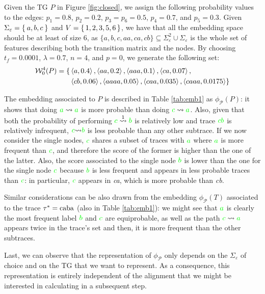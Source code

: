 \begin{example}\label{ex:withpaths}
Given the TG $P$ in Figure \ref{fig:closed}, we assign the following probability values to the edges: $p_1=0.8$, $p_2=0.2$, $p_3=p_6=0.5$, $p_4=0.7$, and $p_5=0.3$. Given $\Sigma_\varepsilon=\Set{a,b,c}$ and $V=\set{1,2,3,5,6}$, we have that all the embedding space should be at least of size $6$, as $\{a,b,c,aa,ca,cb\}\subseteq \Sigma_\varepsilon^2\cup\Sigma_\varepsilon$ is the whole set of features describing both the transition matrix and the nodes. By choosing $t_f=0.0001$, $\lambda=0.7$, $n=4$, and $p=0$, we generate the following set:
$$\begin{aligned}
\mathcal{W}_0^4(P)=\{&\braket{a,0.4},\braket{aa,0.2},\braket{aaa,0.1},\braket{ca,0.07},\\
&\braket{cb,0.06},\braket{aaaa,0.05},\braket{caa,0.035},\braket{caaa,0.0175}\}\\
\end{aligned}$$


The embedding associated to $P$ is described in Table \ref{tab:emb1} as $\phi_{\mathcal{P}}(P)$: it shows that doing ${\color{green}a}\rightsquigarrow{\color{green}a}$ is more probable than doing  ${\color{green}c}\rightsquigarrow{\color{green}a}$. Also, given that both the probability of performing ${\color{green}c}\overset{1}{\rightsquigarrow}{\color{green}b}$ is relatively low and trace $\color{green}cb$ is relatively infrequent, ${\color{green}c}{\rightsquigarrow}{\color{green}b}$ is less probable than any other subtrace. If we now consider the single nodes, $\color{green}c$ shares a subset of traces with $\color{green}a$ where $\color{green}a$ is more frequent than $\color{green}c$, and therefore the score of the former is higher than the one of the latter. Also, the score associated to the single node $\color{green}b$ is lower than the one for the single node $\color{green}c$ because $\color{green}b$ is less frequent and appears in less probable traces than $\color{green}c$: in particular, $\color{green}c$ appears in \textit{ca}, which is more probable than \textit{cb}.

Similar considerations can be also drawn from the embedding $\phi_{\mathcal{P}}(T)$ associated to the trace $\tau^*=\textup{caba}$ (also in Table \ref{tab:emb1}): we might see that ${\color{green}a}$ is clearly the most frequent label ${\color{green}b}$ and ${\color{green}c}$ are equiprobable, as well as the path ${\color{green}c}\rightsquigarrow {\color{green}a}$ appears twice in the trace's set and then, it is more frequent than the other subtraces.

Last, we can observe that the representation of $\phi_{\mathcal{P}}$ only depends on the $\Sigma_\varepsilon$ of choice and on the TG that we want to represent. As a consequence, this representation is entirely independent of the alignment that we might be interested in calculating in a subsequent step. 
\end{example}

